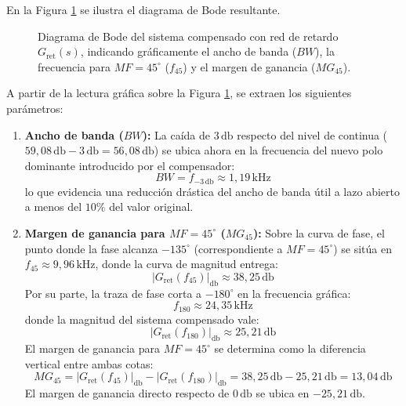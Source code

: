 En la Figura \ref{fig.ej2:bode_retardo} se ilustra el diagrama de Bode resultante.

\begin{figure}[!ht]
    \centering
    
    \caption{Diagrama de Bode del sistema compensado con red de retardo $G_{\text{ret}}(s)$, indicando gráficamente el ancho de banda ($BW$), la frecuencia para $MF = 45^\circ$ ($f_{45}$) y el margen de ganancia ($MG_{45}$).}
    \label{fig.ej2:bode_retardo}
\end{figure}

A partir de la lectura gráfica sobre la Figura \ref{fig.ej2:bode_retardo}, se extraen los siguientes parámetros:

\begin{enumerate}
    \item \textbf{Ancho de banda ($BW$):} La caída de $3\,\si{\decibel}$ respecto del nivel de continua ($59,08\,\si{\decibel} - 3\,\si{\decibel} = 56,08\,\si{\decibel}$)
    se ubica ahora en la frecuencia del nuevo polo dominante introducido por el compensador:
    \begin{equation}
        BW = f_{-3\,\si{\decibel}} \approx 1,19\,\si{\kilo\hertz}
    \end{equation}
    lo que evidencia una reducción drástica del ancho de banda útil a lazo abierto a menos del $10\%$ del valor original.

    \item \textbf{Margen de ganancia para $MF = 45^\circ$ ($MG_{45}$):} Sobre la curva de fase, el punto donde la fase
    alcanza $-135^\circ$ (correspondiente a $MF = 45^\circ$) se sitúa en $f_{45} \approx 9,96\,\si{\kilo\hertz}$, donde la curva
    de magnitud entrega:
    \begin{equation}
        |G_{\text{ret}}(f_{45})|_{\si{\decibel}} \approx 38,25\,\si{\decibel}
    \end{equation}
    Por su parte, la traza de fase corta a $-180^\circ$ en la frecuencia gráfica:
    \begin{equation}
        f_{180} \approx 24,35\,\si{\kilo\hertz}
    \end{equation}
    donde la magnitud del sistema compensado vale:
    \begin{equation}
        |G_{\text{ret}}(f_{180})|_{\si{\decibel}} \approx 25,21\,\si{\decibel}
    \end{equation}
    El margen de ganancia para $MF = 45^\circ$ se determina como la diferencia vertical entre ambas cotas:
    \begin{equation}
        MG_{45} = |G_{\text{ret}}(f_{45})|_{\si{\decibel}} - |G_{\text{ret}}(f_{180})|_{\si{\decibel}} = 38,25\,\si{\decibel} - 25,21\,\si{\decibel} = 13,04\,\si{\decibel}
    \end{equation}
    El margen de ganancia directo respecto de $0\,\si{\decibel}$ se ubica en $-25,21\,\si{\decibel}$.
\end{enumerate}

